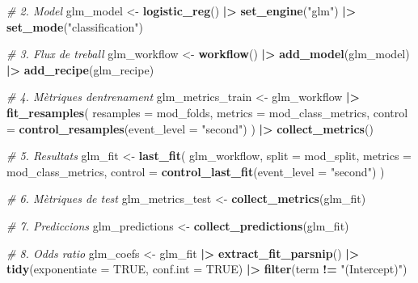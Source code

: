 \documentclass[CAT]{TFUOC}%
\newenvironment{Shaded}{\begin{snugshade}}{\end{snugshade}}
\newcommand{\AttributeTok}[1]{\textcolor[rgb]{0.13,0.29,0.53}{#1}}
\newcommand{\CommentTok}[1]{\textcolor[rgb]{0.56,0.35,0.01}{\textit{#1}}}
\newcommand{\ConstantTok}[1]{\textcolor[rgb]{0.56,0.35,0.01}{#1}}
\newcommand{\FunctionTok}[1]{\textcolor[rgb]{0.13,0.29,0.53}{\textbf{#1}}}
\newcommand{\NormalTok}[1]{#1}
\newcommand{\OtherTok}[1]{\textcolor[rgb]{0.56,0.35,0.01}{#1}}
\newcommand{\SpecialCharTok}[1]{\textcolor[rgb]{0.81,0.36,0.00}{\textbf{#1}}}
\newcommand{\StringTok}[1]{\textcolor[rgb]{0.31,0.60,0.02}{#1}}
\begin{document}
\begin{Shaded}
\begin{Highlighting}[]
\CommentTok{\# 2. Model}
\NormalTok{glm\_model }\OtherTok{\textless{}{-}} \FunctionTok{logistic\_reg}\NormalTok{() }\SpecialCharTok{|\textgreater{}} 
  \FunctionTok{set\_engine}\NormalTok{(}\StringTok{"glm"}\NormalTok{) }\SpecialCharTok{|\textgreater{}} 
  \FunctionTok{set\_mode}\NormalTok{(}\StringTok{"classification"}\NormalTok{)}

\CommentTok{\# 3. Flux de treball}
\NormalTok{glm\_workflow }\OtherTok{\textless{}{-}} \FunctionTok{workflow}\NormalTok{() }\SpecialCharTok{|\textgreater{}} 
  \FunctionTok{add\_model}\NormalTok{(glm\_model) }\SpecialCharTok{|\textgreater{}} 
  \FunctionTok{add\_recipe}\NormalTok{(glm\_recipe)}

\CommentTok{\# 4. Mètriques d\textquotesingle{}entrenament}
\NormalTok{glm\_metrics\_train }\OtherTok{\textless{}{-}}\NormalTok{ glm\_workflow }\SpecialCharTok{|\textgreater{}} 
  \FunctionTok{fit\_resamples}\NormalTok{(}
    \AttributeTok{resamples =}\NormalTok{ mod\_folds, }
    \AttributeTok{metrics =}\NormalTok{ mod\_class\_metrics, }
    \AttributeTok{control =} \FunctionTok{control\_resamples}\NormalTok{(}\AttributeTok{event\_level =} \StringTok{"second"}\NormalTok{)}
\NormalTok{  ) }\SpecialCharTok{|\textgreater{}} 
  \FunctionTok{collect\_metrics}\NormalTok{()}

\CommentTok{\# 5. Resultats}
\NormalTok{glm\_fit }\OtherTok{\textless{}{-}} \FunctionTok{last\_fit}\NormalTok{(}
\NormalTok{  glm\_workflow, }
  \AttributeTok{split =}\NormalTok{ mod\_split, }
  \AttributeTok{metrics =}\NormalTok{ mod\_class\_metrics, }
  \AttributeTok{control =} \FunctionTok{control\_last\_fit}\NormalTok{(}\AttributeTok{event\_level =} \StringTok{"second"}\NormalTok{)}
\NormalTok{)}

\CommentTok{\# 6. Mètriques de test}
\NormalTok{glm\_metrics\_test }\OtherTok{\textless{}{-}} \FunctionTok{collect\_metrics}\NormalTok{(glm\_fit)}

\CommentTok{\# 7. Prediccions}
\NormalTok{glm\_predictions }\OtherTok{\textless{}{-}} \FunctionTok{collect\_predictions}\NormalTok{(glm\_fit)}

\CommentTok{\# 8. Odds ratio}
\NormalTok{glm\_coefs }\OtherTok{\textless{}{-}}\NormalTok{ glm\_fit }\SpecialCharTok{|\textgreater{}} 
  \FunctionTok{extract\_fit\_parsnip}\NormalTok{() }\SpecialCharTok{|\textgreater{}} 
  \FunctionTok{tidy}\NormalTok{(}\AttributeTok{exponentiate =} \ConstantTok{TRUE}\NormalTok{, }\AttributeTok{conf.int =} \ConstantTok{TRUE}\NormalTok{) }\SpecialCharTok{|\textgreater{}} 
  \FunctionTok{filter}\NormalTok{(term }\SpecialCharTok{!=} \StringTok{"(Intercept)"}\NormalTok{)}


\end{Highlighting}
\end{Shaded}
\end{document}
